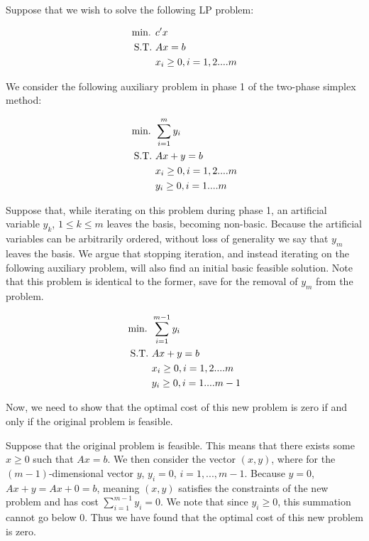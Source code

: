 Suppose that we wish to solve the following LP problem:

\begin{align}
    \text{min. } &c'x \notag\\
    \text{S.T. } &Ax = b \notag\\
    &x_i \ge 0, i = 1,2....m \notag\\
\end{align}

We consider the following auxiliary problem in phase 1 of the two-phase simplex method:

\begin{align}
    \text{min. } &\sum_{i=1}^{m}y_i \notag\\
    \text{S.T. } &Ax + y = b \notag\\
    &x_i \ge 0, i = 1,2....m \notag\\
    &y_i \ge 0, i = 1....m \notag\\
\end{align}

Suppose that, while iterating on this problem during phase 1, an artificial variable $y_k$, $1\leq k\leq m$ leaves the basis, becoming non-basic. Because the artificial variables can be arbitrarily ordered, without loss of generality we say that $y_m$ leaves the basis. We argue that stopping iteration, and instead iterating on the following auxiliary problem, will also find an initial basic feasible solution. Note that this problem is identical to the former, save for the removal of $y_m$ from the problem.

\begin{align}
    \text{min. } &\sum_{i=1}^{m-1}y_i \notag\\
    \text{S.T. } &Ax + y = b \notag\\
    &x_i \ge 0, i = 1,2....m \notag\\
    &y_i \ge 0, i = 1....m-1 \notag\\
\end{align}

Now, we need to show that the optimal cost of this new problem is zero if and only if the original problem is feasible. 

Suppose that the original problem is feasible. This means that there exists some $x\geq0$ such that $Ax=b$. We then consider the vector $(x,y)$, where for the $(m-1)$-dimensional vector $y$, $y_i=0$, $i=1, ..., m-1$. Because $y=0$, $Ax+y=Ax+0=b$, meaning $(x,y)$ satisfies the constraints of the new problem and has cost $\sum_{i=1}^{m-1}y_i=0$. We note that since $y_i\geq 0$, this summation cannot go below $0$. Thus we have found that the optimal cost of this new problem is zero.

